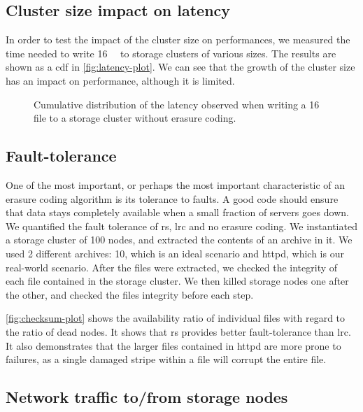 \subsection{Cluster size impact on latency}
\label{subsec:latency}

In order to test the impact of the cluster size on performances, we measured the time needed to write \SI{16}{\mebi\byte} to storage clusters of various sizes.
The results are shown as a \ac{cdf} in \autoref{fig:latency-plot}.
We can see that the growth of the cluster size has an impact on performance, although it is limited.

\begin{figure}[th]
    \centering
    
    \caption{Cumulative distribution of the latency observed when writing a \SI{16}{\mebi\byte} file to a storage cluster without erasure coding.}
    \label{fig:latency-plot}
\end{figure}


\subsection{Fault-tolerance}
\label{subsec:fault-tolerance}

One of the most important, or perhaps the most important characteristic of an erasure coding algorithm is its tolerance to faults.
A good code should ensure that data stays completely available when a small fraction of servers goes down.
We quantified the fault tolerance of \acf{rs}, \acf{lrc} and no erasure coding.
We instantiated a storage cluster of 100 nodes, and extracted the contents of an archive in it.
We used 2 different archives: \SI{10}{\byte}, which is an ideal scenario and httpd, which is our real-world scenario.
After the files were extracted, we checked the integrity of each file contained in the storage cluster.
We then killed storage nodes one after the other, and checked the files integrity before each step.

\autoref{fig:checksum-plot} shows the availability ratio of individual files with regard to the ratio of dead nodes.
It shows that \ac{rs} provides better fault-tolerance than \ac{lrc}.
It also demonstrates that the larger files contained in httpd are more prone to failures, as a single damaged stripe within a file will corrupt the entire file.



\subsection{Network traffic to/from storage nodes}
\label{subsec:network-traffic}


